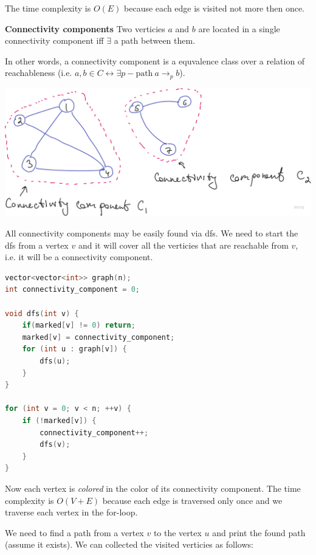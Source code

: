 The time complexity is $O(E)$ because each edge is visited not more then once.

\begin{definition}\textbf{Connectivity components}
    Two verticies $a$ and $b$ are located in a single connectivity component iff $\exists$ a path between them.

    In other words, a connectivity component is a equvalence class over a relation of reachableness (i.e. $a, b \in C \leftrightarrow \exists p - \text{path}\ a \to_{p} b$).
\end{definition}

\begin{center}
    \includegraphics[scale=0.25]{./assets/14-graphs-and-basic-dfs/2.png}
\end{center}

All connectivity components may be easily found via dfs. We need to start the dfs from a vertex $v$ and it will cover all the verticies that are reachable from $v$, i.e. it will be a connectivity component.

\begin{lstlisting}[language=C++]
vector<vector<int>> graph(n);
int connectivity_component = 0;

void dfs(int v) {
    if(marked[v] != 0) return;
    marked[v] = connectivity_component;
    for (int u : graph[v]) {
        dfs(u);
    }
}

for (int v = 0; v < n; ++v) {
    if (!marked[v]) {
        connectivity_component++;
        dfs(v);
    }
}
\end{lstlisting}

Now each vertex is \textit{colored} in the color of its connectivity component. The time complexity is $O(V + E)$ because each edge is traversed only once and we traverse each vertex in the for-loop.


We need to find a path from a vertex $v$ to the vertex $u$ and print the found path (assume it exists). We can collected the visited verticies as follows:

